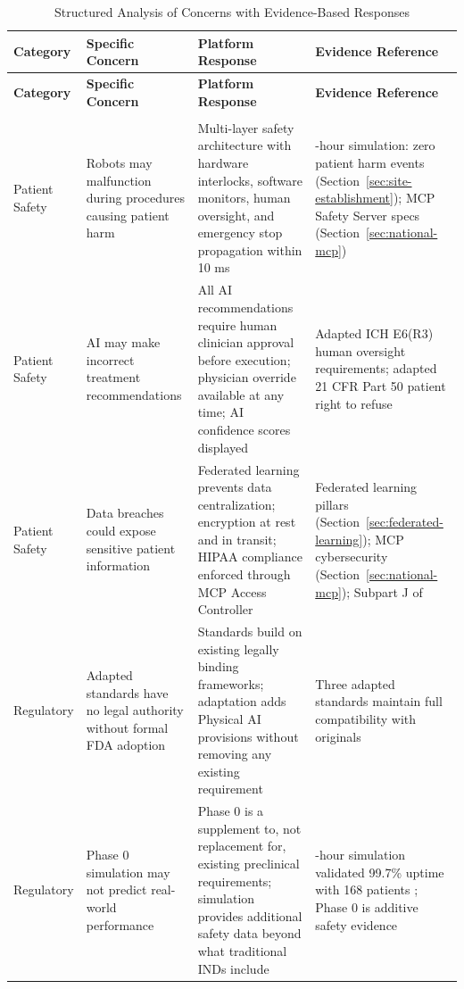 \begin{longtable}{>{\raggedright\arraybackslash}p{2.2cm} >{\raggedright\arraybackslash}p{3.5cm} >{\raggedright\arraybackslash}p{4.5cm} >{\raggedright\arraybackslash}p{4.5cm}}
\caption{Structured Analysis of Concerns with Evidence-Based Responses}
\label{tab:structured-concerns} \\
\toprule
\textbf{Category} & \textbf{Specific Concern} & \textbf{Platform Response} & \textbf{Evidence Reference} \\
\midrule
\endfirsthead
\toprule
\textbf{Category} & \textbf{Specific Concern} & \textbf{Platform Response} & \textbf{Evidence Reference} \\
\midrule
\endhead
\midrule
\multicolumn{4}{r}{\textit{Continued on next page}} \\
\bottomrule
\endfoot
\bottomrule
\endlastfoot
Patient Safety & Robots may malfunction during procedures causing patient harm & Multi-layer safety architecture with hardware interlocks, software monitors, human oversight, and emergency stop propagation within 10 ms & 24-hour simulation: zero patient harm events (Section~\ref{sec:site-establishment}); MCP Safety Server specs (Section~\ref{sec:national-mcp}) \\
\midrule
Patient Safety & AI may make incorrect treatment recommendations & All AI recommendations require human clinician approval before execution; physician override available at any time; AI confidence scores displayed & Adapted ICH E6(R3) \cite{ich-adapt} human oversight requirements; adapted 21 CFR Part 50 \cite{cfr50-adapt} patient right to refuse \\
\midrule
Patient Safety & Data breaches could expose sensitive patient information & Federated learning prevents data centralization; encryption at rest and in transit; HIPAA compliance enforced through MCP Access Controller & Federated learning pillars (Section~\ref{sec:federated-learning}); MCP cybersecurity (Section~\ref{sec:national-mcp}); Subpart J of \cite{cfr312-adapt} \\
\midrule
Regulatory & Adapted standards have no legal authority without formal FDA adoption & Standards build on existing legally binding frameworks; adaptation adds Physical AI provisions without removing any existing requirement & Three adapted standards \cite{ich-adapt, cfr50-adapt, cfr312-adapt} maintain full compatibility with originals \\
\midrule
Regulatory & Phase 0 simulation may not predict real-world performance & Phase 0 is a supplement to, not replacement for, existing preclinical requirements; simulation provides additional safety data beyond what traditional INDs include & 24-hour simulation validated 99.7\% uptime with 168 patients \cite{site-docs}; Phase 0 is additive safety evidence \\

\end{longtable}
